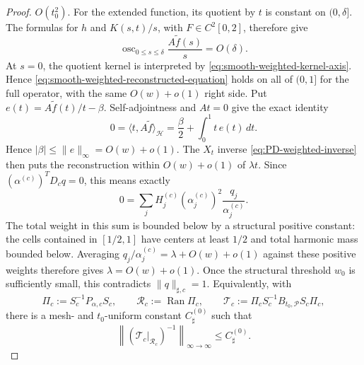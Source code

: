\documentclass[11pt]{article}
\numberwithin{equation}{section}
\theoremstyle{definition}
\theoremstyle{remark}
\newcommand{\1}{\mathbf 1}
\begin{document}
\begin{proof}
\(O(t_0^2)\).  For the extended function, its quotient by \(t\) is
constant on \((0,\delta]\).  The formulas for \(h\) and \(K(s,t)/s\),
with \(F\in C^2[0,2]\), therefore give
\[
 \operatorname{osc}_{0\leq s\leq\delta}
 \frac{A\widetilde f(s)}s=O(\delta).
\]
At \(s=0\), the quotient kernel is interpreted by
\eqref{eq:smooth-weighted-kernel-axis}.  Hence
\eqref{eq:smooth-weighted-reconstructed-equation} holds on all of
\((0,1]\) for the full operator, with the same \(O(w)+o(1)\) right
side.  Put \(e(t)=A\widetilde f(t)/t-\beta\).  Self-adjointness and
\(At=0\) give the exact identity
\[
 0=\langle t,A\widetilde f\rangle_{\mathcal H}
  =\frac{\beta}{2}+\int_0^1t\,e(t)\,dt.
\]
Hence \(|\beta|\leq\|e\|_\infty=O(w)+o(1)\).  The \(X_t\) inverse
\eqref{eq:PD-weighted-inverse} then puts the reconstruction within
\(O(w)+o(1)\) of \(\lambda t\).  Since
\((\alpha^{(c)})^TD_cq=0\), this means exactly
\[
 0=\sum_jH_j^{(c)}(\alpha_j^{(c)})^2
       \frac{q_j}{\alpha_j^{(c)}}.
\]
The total weight in this sum is bounded below by a structural positive
constant: the cells contained in \([1/2,1]\) have centers at least
\(1/2\) and total harmonic mass bounded below.  Averaging
\(q_j/\alpha_j^{(c)}=\lambda+O(w)+o(1)\) against these positive weights
therefore gives \(\lambda=O(w)+o(1)\).  Once the structural threshold
\(w_0\) is sufficiently small, this contradicts
\(\|q\|_{\sharp,c}=1\).  Equivalently, with
\begin{equation}
 \Pi_c:=S_c^{-1}P_{\alpha,c}S_c,\qquad
 \mathcal R_c:=\operatorname{Ran}\Pi_c,\qquad
 \mathcal T_c:=\Pi_cS_c^{-1}B_{t_0,\mathcal P}S_c\Pi_c,
 \label{eq:smooth-continuum-sharp-operator}
\end{equation}
there is a mesh- and \(t_0\)-uniform constant \(C_\sharp^{(0)}\) such
that
\begin{equation}
 \left\|(\mathcal T_c|_{\mathcal R_c})^{-1}\right\|_{\infty\to\infty}
 \le C_\sharp^{(0)}.
 \label{eq:smooth-continuum-sharp-inverse}
\end{equation}


\end{proof}
\end{document}
